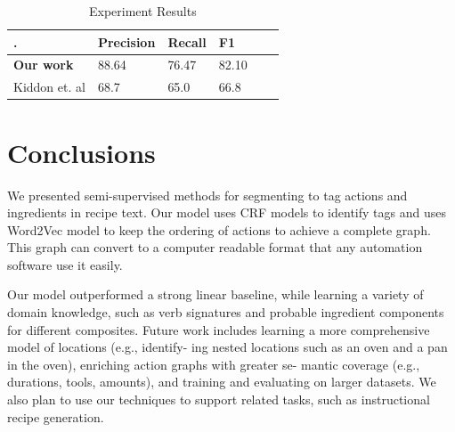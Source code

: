  \begin{table}[]
\centering
\caption{Experiment Results}
\label{my-label}
\begin{tabular}{|l|l|l|l|l|l|}
\hline
 .    & \textbf{Precision}     &  \textbf{Recall}  & \textbf{F1} \\ \hline
\textbf{Our work}    &  88.64    & 76.47 & 82.10      \\ \hline
Kiddon et. al \cite{kiddon2015mise}   & 68.7& 65.0 & 66.8 \\ \hline
\end{tabular}
\end{table}


\section{Conclusions}
We presented semi-supervised methods for segmenting to tag actions and ingredients in recipe text. Our model uses CRF models to identify tags and uses Word2Vec \cite{word2vec} model to keep the ordering of actions to achieve a complete graph. This graph  can convert to a computer readable format that any automation software  use it easily. 

Our model outperformed a strong linear baseline, while learning a variety of domain knowledge, such as verb signatures and probable ingredient components for different composites. Future work includes learning a more comprehensive model of locations (e.g., identify- ing nested locations such as an oven and a pan in the oven), enriching action graphs with greater se- mantic coverage (e.g., durations, tools, amounts), and training and evaluating on larger datasets. We also plan to use our techniques to support related tasks, such as instructional recipe generation.




